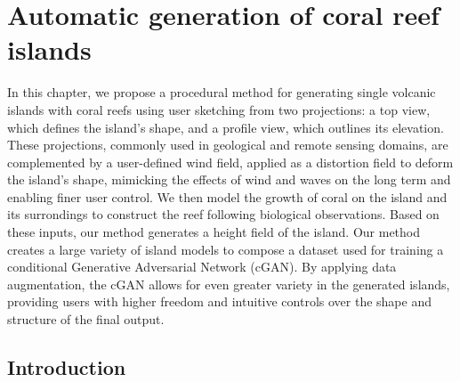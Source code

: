 \resetgraphicspath
{}


\chapter{Automatic generation of coral reef islands}
\label{chap:coral-island}

\abstract 
In this chapter, we propose a procedural method for generating single volcanic islands with coral reefs using user sketching from two projections: a top view, which defines the island's shape, and a profile view, which outlines its elevation. These projections, commonly used in geological and remote sensing domains, are complemented by a user-defined wind field, applied as a distortion field to deform the island's shape, mimicking the effects of wind and waves on the long term and enabling finer user control. We then model the growth of coral on the island and its surrondings to construct the reef following biological observations. Based on these inputs, our method generates a height field of the island. Our method creates a large variety of island models to compose a dataset used for training a conditional Generative Adversarial Network (cGAN). By applying data augmentation, the cGAN allows for even greater variety in the generated islands, providing users with higher freedom and intuitive controls over the shape and structure of the final output.
\pagebreak 

\minitoc


\section{Introduction}
\label{sec:coral-island-introduction}

